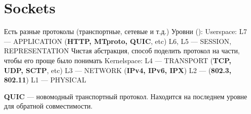\section{Sockets}
Есть разные протоколы (транспортные, сетевые и т.д.)
Уровни ():
Userspace:
    L7 --- APPLICATION (\textbf{HTTP, MTproto, QUIC}, etc)
    L6, L5 --- SESSION, REPRESENTATION
             Чистая абстракция, способ поделить протокол на части, чтобы его проще было понимать
Kernelspace:
    L4 --- TRANSPORT (\textbf{TCP, UDP, SCTP}, etc)
    L3 --- NETWORK (\textbf{IPv4, IPv6, IPX})
    L2 ---  (\textbf{802.3, 802.11})
    L1 --- PHYSICAL

\textbf{QUIC} --- новомодный транспортный протокол. Находится на последнем уровне для обратной совместимости.

